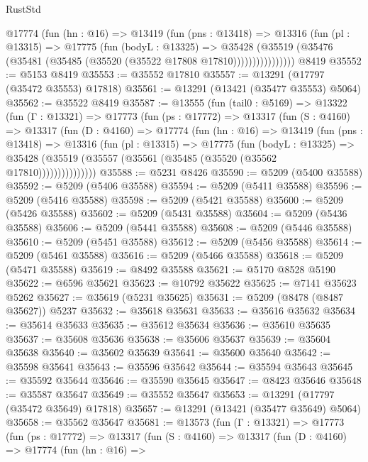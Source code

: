 \begin{lexlean}{RustStd}
\begin{coremodule}
              @17774
                (fun (hn : @16) =>
                @13419
                  (fun (pns : @13418) =>
                  @13316
                    (fun (pl : @13315) =>
                    @17775
                      (fun (bodyL : @13325) =>
                      @35428
                        (@35519
                          (@35476 (@35481 (@35485 (@35520 (@35522 @17808 @17810))))))))))))))))
    @8419
@35552 := @5153 @8419
@35553 := @35552 @17810
@35557 := @13291 (@17797 (@35472 @35553) @17818)
@35561 := @13291 (@13421 (@35477 @35553) @5064)
@35562 := @35522 @8419
@35587 := @13555
    (fun (tail0 : @5169) =>
    @13322
      (fun (Γ : @13321) =>
      @17773
        (fun (ps : @17772) =>
        @13317
          (fun (S : @4160) =>
          @13317
            (fun (D : @4160) =>
            @17774
              (fun (hn : @16) =>
              @13419
                (fun (pns : @13418) =>
                @13316
                  (fun (pl : @13315) =>
                  @17775
                    (fun (bodyL : @13325) =>
                    @35428 (@35519 (@35557 (@35561 (@35485 (@35520 (@35562 @17810)))))))))))))))
@35588 := @5231 @8426
@35590 := @5209 (@5400 @35588)
@35592 := @5209 (@5406 @35588)
@35594 := @5209 (@5411 @35588)
@35596 := @5209 (@5416 @35588)
@35598 := @5209 (@5421 @35588)
@35600 := @5209 (@5426 @35588)
@35602 := @5209 (@5431 @35588)
@35604 := @5209 (@5436 @35588)
@35606 := @5209 (@5441 @35588)
@35608 := @5209 (@5446 @35588)
@35610 := @5209 (@5451 @35588)
@35612 := @5209 (@5456 @35588)
@35614 := @5209 (@5461 @35588)
@35616 := @5209 (@5466 @35588)
@35618 := @5209 (@5471 @35588)
@35619 := @8492 @35588
@35621 := @5170 @8528 @5190
@35622 := @6596 @35621
@35623 := @10792 @35622
@35625 := @7141 @35623 @5262
@35627 := @35619 (@5231 @35625)
@35631 := @5209 (@8478 (@8487 @35627)) @5237
@35632 := @35618 @35631
@35633 := @35616 @35632
@35634 := @35614 @35633
@35635 := @35612 @35634
@35636 := @35610 @35635
@35637 := @35608 @35636
@35638 := @35606 @35637
@35639 := @35604 @35638
@35640 := @35602 @35639
@35641 := @35600 @35640
@35642 := @35598 @35641
@35643 := @35596 @35642
@35644 := @35594 @35643
@35645 := @35592 @35644
@35646 := @35590 @35645
@35647 := @8423 @35646
@35648 := @35587 @35647
@35649 := @35552 @35647
@35653 := @13291 (@17797 (@35472 @35649) @17818)
@35657 := @13291 (@13421 (@35477 @35649) @5064)
@35658 := @35562 @35647
@35681 := @13573
    (fun (Γ : @13321) =>
    @17773
      (fun (ps : @17772) =>
      @13317
        (fun (S : @4160) =>
        @13317
          (fun (D : @4160) =>
          @17774
            (fun (hn : @16) =>

\end{coremodule}
\end{lexlean}
